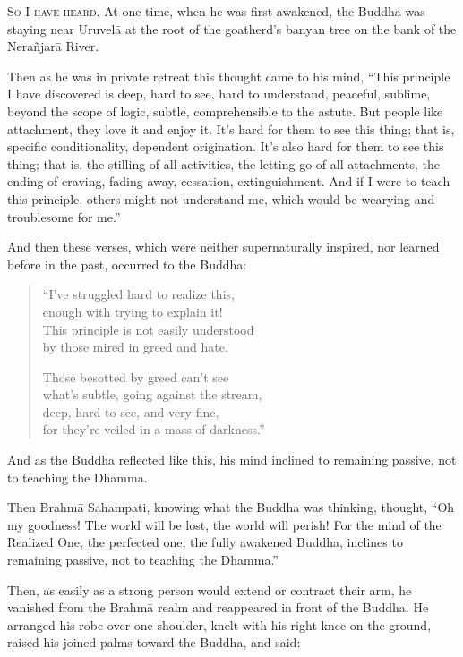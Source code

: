\documentclass[12pt,openany]{book}%
\newcommand*{\scevam}[1]{\textsc{#1}}
\begin{document}
\scevam{So I have heard. }At one time, when he was first awakened, the Buddha was staying near \textsanskrit{Uruvelā} at the root of the goatherd’s banyan tree on the bank of the \textsanskrit{Nerañjarā} River. 

Then as he was in private retreat this thought came to his mind, “This principle I have discovered is deep, hard to see, hard to understand, peaceful, sublime, beyond the scope of logic, subtle, comprehensible to the astute. But people like attachment, they love it and enjoy it. It’s hard for them to see this thing; that is, specific conditionality, dependent origination. It’s also hard for them to see this thing; that is, the stilling of all activities, the letting go of all attachments, the ending of craving, fading away, cessation, extinguishment. And if I were to teach this principle, others might not understand me, which would be wearying and troublesome for me.” 

And then these verses, which were neither supernaturally inspired, nor learned before in the past, occurred to the Buddha: 

\begin{verse}%
“I’ve struggled hard to realize this, \\
enough with trying to explain it! \\
This principle is not easily understood \\
by those mired in greed and hate. 

Those besotted by greed can’t see \\
what’s subtle, going against the stream, \\
deep, hard to see, and very fine, \\
for they’re veiled in a mass of darkness.” 

%
\end{verse}

And as the Buddha reflected like this, his mind inclined to remaining passive, not to teaching the Dhamma. 

Then \textsanskrit{Brahmā} Sahampati, knowing what the Buddha was thinking, thought, “Oh my goodness! The world will be lost, the world will perish! For the mind of the Realized One, the perfected one, the fully awakened Buddha, inclines to remaining passive, not to teaching the Dhamma.” 

Then, as easily as a strong person would extend or contract their arm, he vanished from the \textsanskrit{Brahmā} realm and reappeared in front of the Buddha. He arranged his robe over one shoulder, knelt with his right knee on the ground, raised his joined palms toward the Buddha, and said: 
\end{document}
